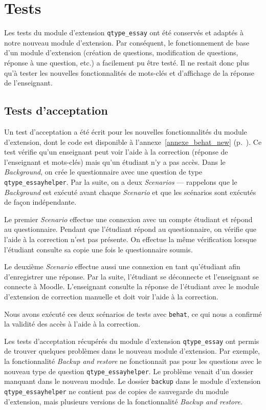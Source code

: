 \section{Tests} \label{dev_test}
Les tests du module d'extension \texttt{qtype\_essay} ont \'et\'e conserv\'es et adapt\'es \`a notre nouveau module d'extension.
Par cons\'equent, le fonctionnement de base d'un module d'extension (cr\'eation de questions, modification de questions, r\'eponse \`a une question, etc.) a facilement pu \^etre test\'e.
Il ne restait donc plus qu'\`a tester les nouvelles fonctionnalit\'es de mots-cl\'es et d'affichage de la r\'eponse de l'enseignant.

\subsection{Tests d'acceptation} \label{dev_test_acceptation}
Un test d'acceptation a \'et\'e \'ecrit pour les nouvelles fonctionnalit\'es du module d'extension, dont le code est disponible \`a l'annexe~\ref{annexe_behat_new} (p.~\pageref{annexe_behat_new}).
Ce test v\'erifie qu'un enseignant peut voir l'aide \`a la correction (r\'eponse de l'enseignant et mots-cl\'es) mais qu'un \'etudiant n'y a pas acc\`es.
Dans le \textit{Background}, on crée le questionnaire avec une question de type \texttt{qtype\_essayhelper}.
Par la suite, on a deux \textit{Scenarios} --- rappelons que le \textit{Background} est ex\'ecut\'e avant chaque \textit{Scenario} et que les sc\'enarios sont ex\'ecut\'es de fa\c{c}on ind\'ependante.

Le premier \textit{Scenario} effectue une connexion avec un compte \'etudiant et r\'epond au questionnaire.
Pendant que l'\'etudiant r\'epond au questionnaire, on v\'erifie que l'aide \`a la correction n'est pas pr\'esente.
On effectue la m\^eme v\'erification lorsque l'\'etudiant consulte sa copie une fois le questionnaire soumis.

Le deuxi\`eme \textit{Scenario} effectue aussi une connexion en tant qu'\'etudiant afin d'enregistrer une r\'eponse.
Par la suite, l'\'etudiant se d\'econnecte et l'enseignant se connecte à Moodle.
L'enseignant consulte la r\'eponse de l'\'etudiant avec le module d'extension de correction manuelle et doit voir l'aide \`a la correction.

Nous avons ex\'ecut\'e ces deux sc\'enarios de tests avec \texttt{behat}, ce qui nous a confirm\'e la validit\'e des acc\`es \`a l'aide \`a la correction.

Les tests d'acceptation r\'ecup\'er\'es du module d'extension \texttt{qtype\_essay} ont permis de trouver quelques probl\`emes  dans le nouveau module d'extension.
Par exemple, la fonctionnalit\'e \textit{Backup and restore} ne fonctionnait pas pour les questions avec le nouveau type de question \texttt{qtype\_essayhelper}.
Le probl\`eme venait d'un dossier manquant dans le nouveau module.
Le dossier \texttt{backup} dans le module d'extension \texttt{qtype\_essayhelper} ne contient pas de copies de sauvegarde du module d'extension, mais plusieurs versions de la fonctionnalit\'e \textit{Backup and restore}.

